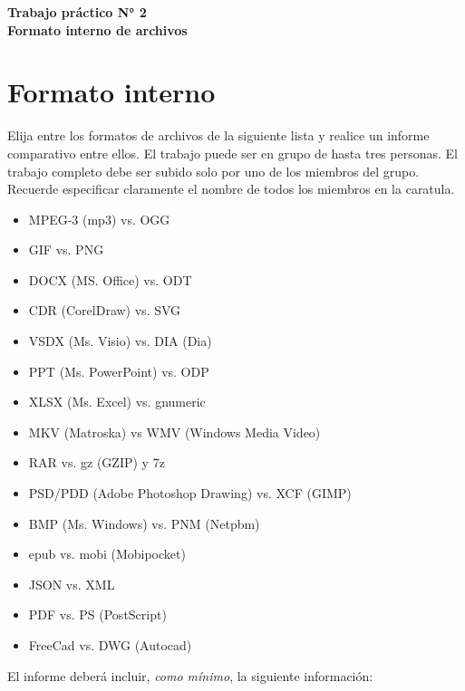 \documentclass[12pt]{article}
\def\maketitle{

\makeatletter
{\color{bl} \centering \huge \sc \textbf{
Trabajo práctico N° 2\\
\large \vspace*{-8pt} \color{black} Formato interno de archivos
\vspace*{8pt} }\par}
\makeatother

\makeatletter


}
\begin{document}
\thispagestyle{empty}
\maketitle
\setlength{\parindent}{0pt}

\section*{Formato interno}

Elija entre los formatos de archivos de la siguiente lista y realice un
informe comparativo entre ellos. El trabajo puede ser en grupo de hasta tres
personas. El trabajo completo debe ser subido solo por uno de los miembros del
grupo. Recuerde especificar claramente el nombre de todos los miembros en la
caratula.

\begin{itemize}
    \itemsep2pt \parskip0pt 
    \item MPEG-3 (mp3) vs. OGG
    \item GIF vs. PNG
    \item DOCX (MS. Office) vs. ODT
    \item CDR (CorelDraw) vs. SVG
    \item VSDX (Ms. Visio) vs. DIA (Dia)
    \item PPT (Ms. PowerPoint) vs. ODP
    \item XLSX (Ms. Excel) vs. gnumeric
    \item MKV (Matroska) vs WMV (Windows Media Video)
    \item RAR vs. gz (GZIP) y 7z
    \item PSD/PDD (Adobe Photoshop Drawing) vs. XCF (GIMP)
    \item BMP (Ms. Windows) vs. PNM (Netpbm)
    \item epub vs. mobi (Mobipocket)
    \item JSON vs. XML
    \item PDF vs. PS (PostScript)
    \item FreeCad vs. DWG (Autocad)
\end{itemize}

El informe deberá incluir, {\it como mínimo}, la siguiente información:
\end{document}

